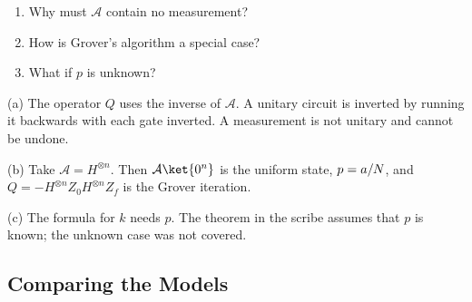 \begin{exercisebox}
\begin{pproblem}\label{pp:ampshort}
    \leavevmode
    \begin{enumerate}[label=(\alph*)]
        \item Why must $\mathcal{A}$ contain no measurement?
        \item How is Grover's algorithm a special case?
        \item What if $p$ is unknown?
    \end{enumerate}
\end{pproblem}
\tcblower
\begin{wsolution}
    (a) The operator $Q$ uses the inverse of $\mathcal{A}$. A unitary circuit is inverted by running
    it backwards with each gate inverted. A measurement is not unitary and cannot be undone.

    (b) Take $\mathcal{A} = H^{\otimes n}$. Then $\mathcal{A}\ket{0^n}$ is the uniform state,
    $p = a/N$, and $Q = -H^{\otimes n} Z_0 H^{\otimes n} Z_f$ is the Grover iteration.

    (c) The formula for $k$ needs $p$. The theorem in the scribe assumes that $p$ is known; the
    unknown case was not covered.
\end{wsolution}
\end{exercisebox}

\subsection{Comparing the Models}


